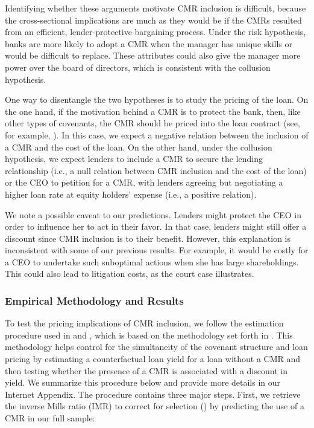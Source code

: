 \documentclass[a4paper,12pt]{article}
\begin{document}
Identifying whether these arguments motivate CMR inclusion is difficult, because the cross-sectional implications are much as they would be if the CMRs resulted from an efficient, lender-protective bargaining process.
Under the risk hypothesis, banks are more likely to adopt a CMR when the manager has unique skills or would be difficult to replace.
These attributes could also give the manager more power over the board of directors, which is consistent with the collusion hypothesis.



One way to disentangle the two hypotheses is to study the pricing of the loan.
On the one hand, if the motivation behind a CMR is to protect the bank, then, like other types of covenants, the CMR should be priced into the loan contract (see, for example, \citet{Bradley_2015}).
In this case, we expect a negative relation between the inclusion of a CMR and the cost of the loan.
On the other hand, under the collusion hypothesis, we expect lenders to include a CMR to secure the lending relationship (i.e., a null relation between CMR inclusion and the cost of the loan) or the CEO to petition for a CMR, with lenders agreeing but negotiating a higher loan rate at equity holders' expense (i.e., a positive relation).



We note a possible caveat to our predictions.
Lenders might protect the CEO in order to influence her to act in their favor.
In that case, lenders might still offer a discount since CMR inclusion is to their benefit.
However, this explanation is inconsistent with some of our previous results.
For example, it would be costly for a CEO to undertake such suboptimal actions when she has large shareholdings.
This could also lead to litigation costs, as the court case illustrates.



\subsubsection{Empirical Methodology and Results} \label{section:pricing_tests}


To test the pricing implications of CMR inclusion, we follow the estimation procedure used in \citet{Miller_2012} and \citet{Bradley_2015}, which is based on the methodology set forth in \citet{Lee_1978}.
This methodology helps control for the simultaneity of the covenant structure and loan pricing by estimating a counterfactual loan yield for a loan without a CMR and then testing whether the presence of a CMR is associated with a discount in yield.
We summarize this procedure below and provide more details in our Internet Appendix.
The procedure contains three major steps.
First, we retrieve the inverse Mills ratio (IMR) to correct for selection (\citet{Heckman_1979}) by predicting the use of a CMR in our full sample:
\end{document}
